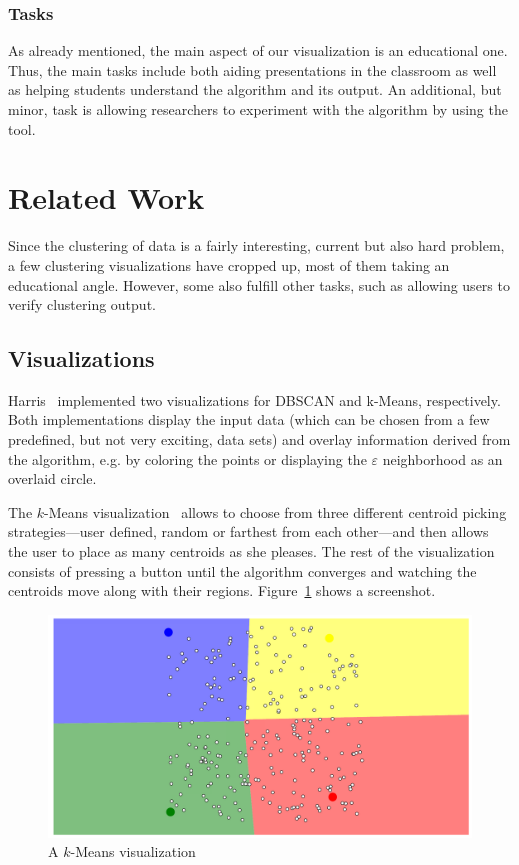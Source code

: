 \documentclass{vgtc} %
\begin{document}
\subsubsection{Tasks}

As already mentioned, the main aspect of our visualization is an educational one.
Thus, the main tasks include both aiding presentations in the classroom as well as
helping students understand the algorithm and its output. An additional, but minor,
task is allowing researchers to experiment with the algorithm by using the tool.

\section{Related Work} %

Since the clustering of data is a fairly interesting, current but also hard
problem, a few clustering visualizations have cropped up, most of them taking
an educational angle. However, some also fulfill other tasks, such as allowing
users to verify clustering output.

\subsection{Visualizations}

Harris~\cite{dbscan,kmeans} implemented two visualizations for DBSCAN and
k-Means, respectively. Both implementations display the input data (which can
be chosen from a few predefined, but not very exciting, data sets) and overlay
information derived from the algorithm, e.g. by coloring the points or
displaying the $\varepsilon$ neighborhood as an overlaid circle.

The $k$-Means visualization~\cite{kmeans} allows to choose from three different
centroid picking strategies---user defined, random or farthest from each
other---and then allows the user to place as many centroids as she pleases. The
rest of the visualization consists of pressing a button until the algorithm
converges and watching the centroids move along with their regions.
Figure~\ref{fig:kmeans} shows a screenshot.

\begin{figure}[tb]
    \centering
    \includegraphics[width=\columnwidth]{kmeans}
    \caption{A $k$-Means visualization}
    \label{fig:kmeans}
\end{figure}
\end{document}
